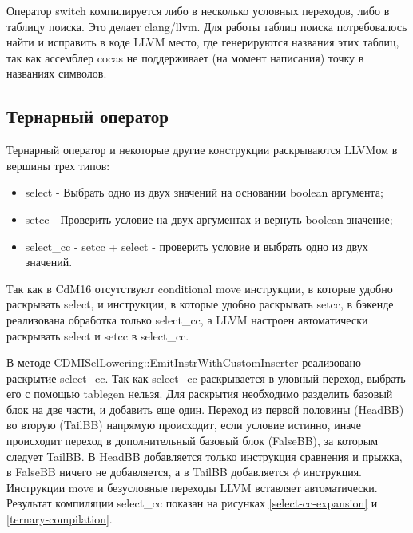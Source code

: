 \documentclass[a4paper,14pt]{extarticle}
\begin{document}
Оператор switch компилируется либо в несколько условных переходов, либо в таблицу поиска. Это делает clang/llvm. Для работы таблиц поиска потребовалось найти и исправить в коде LLVM место, где генерируются названия этих таблиц, так как ассемблер cocas не поддерживает (на момент написания) точку в названиях символов.

\subsection{Тернарный оператор}

Тернарный оператор и некоторые другие конструкции раскрываются LLVMом в вершины трех типов:
\begin{itemize}
	\item select - Выбрать одно из двух значений на основании boolean аргумента;
	\item setcc - Проверить условие на двух аргументах и вернуть boolean значение;
	\item select\_cc - setcc + select - проверить условие и выбрать одно из двух значений.
\end{itemize}

Так как в CdM16 отсутствуют conditional move инструкции, в которые удобно раскрывать select, и инструкции, в которые удобно раскрывать setcc, в бэкенде реализована обработка только select\_cc, а LLVM настроен автоматически раскрывать select и setcc в select\_cc. 

В методе CDMISelLowering::EmitInstrWithCustomInserter реализовано раскрытие select\_cc. Так как select\_cc раскрывается в уловный переход, выбрать его с помощью tablegen нельзя. Для раскрытия необходимо разделить базовый блок на две части, и добавить еще один. Переход из первой половины (HeadBB) во вторую (TailBB) напрямую происходит, если условие истинно, иначе происходит переход в дополнительный базовый блок (FalseBB), за которым следует TailBB. В HeadBB добавляется только инструкция сравнения и прыжка, в FalseBB ничего не добавляется, а в TailBB добавляется  $\phi$ инструкция. Инструкции move и безусловные переходы LLVM вставляет автоматически. Результат компиляции select\_cc показан на рисунках \ref{select-cc-expansion} и \ref{ternary-compilation}.
\end{document}
